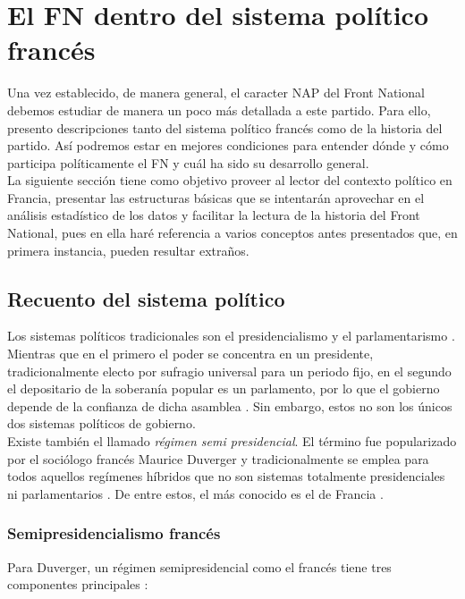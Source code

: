 \chapter{El FN dentro del sistema político francés}

Una vez establecido, de manera general, el caracter NAP del Front National debemos estudiar de manera un poco más detallada a este partido. Para ello, presento descripciones tanto del sistema político francés como de la historia del partido. Así podremos estar en mejores condiciones para entender dónde y cómo participa políticamente el FN y cuál ha sido su desarrollo general.\\

La siguiente sección tiene como objetivo proveer al lector del contexto político en Francia, presentar las estructuras básicas que se intentarán aprovechar en el análisis estadístico de los datos y facilitar la lectura de la historia del Front National, pues en ella haré referencia a varios conceptos antes presentados que, en primera instancia, pueden resultar extraños.

\section{Recuento del sistema político}

Los sistemas políticos tradicionales son el presidencialismo y el parlamentarismo \parencites{Carpizo04}{Veser99}. Mientras que en el primero el poder se concentra en un presidente, tradicionalmente electo por sufragio universal para un periodo fijo, en el segundo el depositario de la soberanía popular es un parlamento, por lo que el gobierno depende de la confianza de dicha asamblea \parencite{Linz90}. Sin embargo, estos no son los únicos dos sistemas políticos de gobierno.\\ 

Existe también el llamado \textit{régimen semi presidencial}. El término fue popularizado por el sociólogo francés Maurice Duverger y tradicionalmente se emplea para todos aquellos regímenes híbridos que no son sistemas totalmente  presidenciales ni parlamentarios \parencites{Veser99}{Carpizo04}{Linz90}. De entre estos, el más conocido es el de Francia \parencite{Carpizo04}.

\subsection{Semipresidencialismo francés}

Para Duverger, un régimen semipresidencial como el francés tiene tres componentes principales \parencite{Veser99}:

